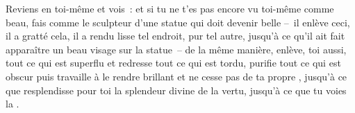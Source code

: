 \documentclass[11pt,twoside,openany]{book}
\newenvironment{lateiDocument}{}{}
\begin{document}
\begin{lateiDocument}
\begin{teiElement}[name={TEI},change={commons\_edition}]
\begin{teiElement}[name={text},type={book},xmlid={book}]
\begin{teiElement}[name={group},type={book},xmlid={book-001}]
\begin{teiElement}[name={group},type={section1},xmlid={section1-001}]
\begin{teiElement}
\begin{teiElement}[name={body},xmlid={body-003}]
\begin{teiCit}[xmlid={cit03}]
              \begin{teiQuote}
Reviens en toi-même et vois : et si tu ne t’es pas encore vu toi-même comme beau, fais comme le sculpteur d’une statue qui doit devenir belle – il enlève ceci, il a gratté cela, il a rendu lisse tel endroit, pur tel autre, jusqu’à ce qu’il ait fait apparaître un beau visage sur la statue – de la même manière, enlève, toi aussi, tout ce qui est superflu et redresse tout ce qui est tordu, purifie tout ce qui est obscur puis travaille à le rendre brillant et ne cesse pas de  ta propre , jusqu’à ce que resplendisse pour toi la splendeur divine de la vertu, jusqu’à ce que tu voies la .
\end{teiQuote}
            

\end{teiCit}
\end{teiElement}
\end{teiElement}
\end{teiElement}
\end{teiElement}
\end{teiElement}
\end{teiElement}
\end{lateiDocument}
\end{document}
